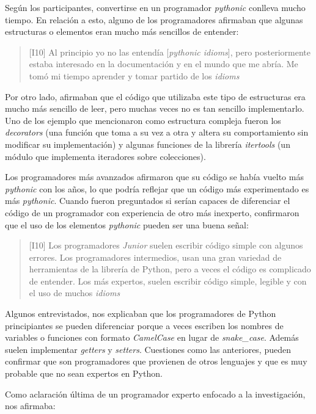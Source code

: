 \documentclass[a4paper, 12pt]{book}
\begin{document}
Según los participantes, convertirse en un programador \textit{pythonic} conlleva mucho tiempo. En relación a esto, alguno de los programadores afirmaban que algunas estructuras o elementos eran mucho más sencillos de entender:

\begin{quote}
\small
    [I10] Al principio yo no las entendía [\textit{pythonic idioms}], pero posteriormente estaba interesado en la documentación y en el mundo que me abría. Me tomó mi tiempo aprender y tomar partido de los \textit{idioms}
\end{quote}

Por otro lado, afirmaban que el código que utilizaba este tipo de estructuras era mucho más sencillo de leer, pero muchas veces no es tan sencillo implementarlo. Uno de los ejemplo que mencionaron como estructura compleja fueron los \textit{decorators} (una función que toma a su vez a otra y altera su comportamiento sin modificar su implementación) y algunas funciones de la librería \textit{itertools} (un módulo que implementa iteradores sobre colecciones).

Los programadores más avanzados afirmaron que su código se había vuelto más \textit{pythonic} con los años, lo que podría reflejar que un código más experimentado es más \textit{pythonic}. Cuando fueron preguntados si serían capaces de diferenciar el código de un programador con experiencia de otro más inexperto, confirmaron que el uso de los elementos \textit{pythonic} pueden ser una buena señal:

\begin{quote}
\small
    [I10] Los programadores \textit{Junior} suelen escribir código simple con algunos errores. Los programadores intermedios, usan una gran variedad de herramientas de la librería de Python, pero a veces el código es complicado de entender. Los más expertos, suelen escribir código simple, legible y con el uso de muchos \textit{idioms}
\end{quote}

Algunos entrevistados, nos explicaban que los programadores de Python principiantes se pueden diferenciar porque a veces escriben los nombres de variables o funciones con formato \textit{CamelCase} en lugar de \textit{snake\_case}. Además suelen implementar \textit{getters} y \textit{setters}. Cuestiones como las anteriores, pueden confirmar que son programadores que provienen de otros lenguajes y que es muy probable que no sean expertos en Python.

Como aclaración última de un programador experto enfocado a la investigación, nos afirmaba:
\end{document}

